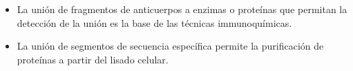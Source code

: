 \begin{itemize}
\item La unión de fragmentos de anticuerpos a enzimas o proteínas que permitan la detección de la unión es la base de las técnicas immunoquímicas.
\item La unión de segmentos de secuencia específica permite la purificación de proteínas a partir del lisado celular. 
\end{itemize}





